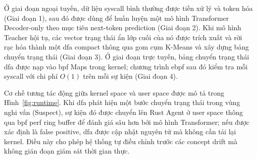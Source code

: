 \documentclass[../main.tex]{subfiles}
\begin{document}
Ở giai đoạn ngoại tuyến, dữ liệu \gls{syscall} bình thường được tiền xử lý
và token hóa (Giai
đoạn 1), sau đó được dùng để huấn luyện một mô hình Transformer
Decoder-only theo mục
tiêu next-token prediction (Giai đoạn 2). Khi mô hình Teacher hội tụ,
các vector trạng
thái ẩn lớp cuối của nó được trích xuất và rời rạc hóa thành một \gls{dfa}
compact thông qua
gom cụm K-Means và xây dựng bảng chuyển trạng thái (Giai đoạn 3). Ở
giai đoạn trực
tuyến, bảng chuyển trạng thái \gls{dfa} được nạp vào \gls{bpf} Maps
trong kernel;
chương trình \gls{ebpf}
sau đó kiểm tra mỗi \gls{syscall} với chi phí $O(1)$ trên mỗi sự kiện
(Giai đoạn 4).

Cơ chế tương tác động giữa kernel space và user space được mô tả trong
Hình~\ref{fig:runtime}. Khi \gls{dfa} phát hiện một bước chuyển trạng thái
trong vùng nghi vấn
(Suspect), sự kiện đó được chuyển lên Rust Agent ở user space thông
qua \gls{bpf} perf ring buffer
để đánh giá sâu hơn bởi mô hình Transformer; nếu được xác định là
false positive, \gls{dfa}
được cập nhật nguyên tử mà không cần tải lại kernel. Điều này cho
phép hệ thống tự điều
chỉnh trước các concept drift mà không gián đoạn giám sát thời gian thực.
\end{document}
